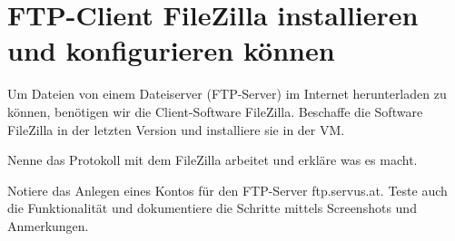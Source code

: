 \chapter{FTP-Client FileZilla installieren und konfigurieren können}
\label{kap:filezilla}

\begin{aufgabe}
Um Dateien von einem Dateiserver (FTP-Server) im Internet herunterladen zu können, benötigen wir die Client-Software FileZilla. Beschaffe die Software FileZilla in der letzten Version und installiere sie in der VM.
\end{aufgabe}

\begin{aufgabe}
Nenne das Protokoll mit dem FileZilla arbeitet und erkläre was es macht.
\end{aufgabe}


\begin{aufgabe}
Notiere das Anlegen eines Kontos für den FTP-Server ftp.servus.at. Teste auch die Funktionalität und dokumentiere die Schritte mittels Screenshots und Anmerkungen.
\end{aufgabe}

